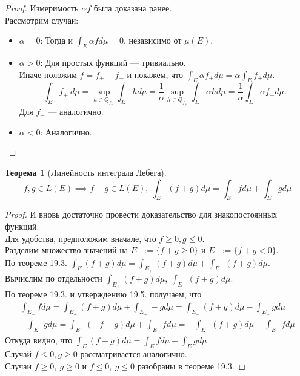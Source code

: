 \documentclass[11pt,a4paper]{report}
\theoremstyle{definition}
\theoremstyle{definition}
\newtheorem{theorem}{Теорема}[section]
\theoremstyle{definition}
\begin{document}
		\begin{proof}
			Измеримость $ \alpha f $ была доказана ранее.\\
			Рассмотрим случаи:
			\begin{itemize}
				\item $ \alpha = 0 $: Тогда и $ \int_{E} \alpha f d\mu = 0 $, независимо от $ \mu(E) $.
				\item $ \alpha > 0 $: Для простых функций — тривиально.\\
				Иначе положим $ f = f_{+} - f_{-} $ и покажем, что $ \int_{E} \alpha f_{+} d\mu = \alpha \int_{E} f_{+} d\mu $.\\
				\[ 
					\int_{E} f_{+}\ d\mu = \sup\limits_{h \in Q_{f_{+}}} \int_{E} h d\mu = \frac{1}{\alpha} \sup\limits_{h \in Q_{f_{+}}} \int_{E} \alpha h d\mu = \frac{1}{\alpha} \int_{E} \alpha f_{+} d\mu.
				\]
				Для $ f_{-} $ — аналогично.
				\item $ \alpha < 0 $: Аналогично. 
			\end{itemize}
		\end{proof}
		\begin{theorem}[Линейность интеграла Лебега]
			\[ f, g \in L(E) \implies f + g \in L(E),\ \int_{E} (f + g) d\mu = \int_{E} f d\mu + \int_{E} g d\mu \]
		\end{theorem}
		\begin{proof}
			И вновь достаточно провести доказательство для знакопостоянных функций.\\
			Для удобства, предположим вначале, что $ f \ge 0, g \le 0 $.\\ 
			Разделим множество значений на $ E_{+} := \{ f + g \ge 0 \} $ и $ E_{-} := \{ f + g < 0 \} $.\\
			По теореме 19.3. $ \int_{E} (f + g) d\mu = \int_{E_{+}} (f + g) d\mu + \int_{E_{-}} (f + g) d\mu $.\\
			Вычислим по отдельности $ \int_{E_{+}} (f + g) d\mu,\ \int_{E_{-}} (f + g) d\mu $.\\
			По теореме 19.3. и утверждению 19.5. получаем, что 
			\begin{gather*}
				\int_{E_{+}} f d \mu = \int_{E_{+}} (f + g) d\mu + \int_{E_{+}} -g d\mu = \int_{E_{+}} (f + g) d\mu - \int_{E_{+}} g d\mu\\
				-\int_{E_{-}} g d \mu = \int_{E_{-}} (-f - g) d\mu + \int_{E_{-}} f d\mu = -\int_{E_{-}} (f + g) d\mu - \int_{E_{-}} f d\mu
			\end{gather*}
			Откуда видно, что $ \int_{E} (f + g) d\mu = \int_{E} f d\mu + \int_{E} g d\mu $.\\
			Случай $ f \le 0, g \ge 0 $ рассматривается аналогично.\\
			Случаи $ f \ge 0,\ g \ge 0 $ и $ f \le 0,\ g \le 0 $ разобраны в теореме 19.3.
		\end{proof}
\end{document}
